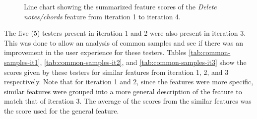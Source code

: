 		\begin{figure}[H]
			\centering
		    \caption{Line chart showing the summarized feature scores of the \textit{Delete notes/chords} feature from iteration 1 to iteration 4.}
		    \label{fig:delete-bar}
		\end{figure} 

		The five (5) testers present in iteration 1 and 2 were also present in iteration 3. This was done to allow an analysis of common samples and see if there was an improvement in the user experience for these testers. Tables \ref{tab:common-samples-it1}, \ref{tab:common-samples-it2}, and \ref{tab:common-samples-it3} show the scores given by these testers for similar features from iteration 1, 2, and 3 respectively. Note that for iteration 1 and 2, since the features were more specific, similar features were grouped into a more general description of the feature to match that of iteration 3. The average of the scores from the similar features was the score used for the general feature.

